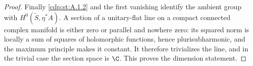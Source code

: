 \begin{proof}
Finally \ref{cdp:st:A.1.2} and the first vanishing identify the ambient group with $H^0(\widetilde S,\eta^*A)$. A section of a unitary-flat line on a compact connected complex manifold is either zero or parallel and nowhere zero: its squared norm is locally a sum of squares of holomorphic functions, hence plurisubharmonic, and the maximum principle makes it constant. It therefore trivializes the line, and in the trivial case the section space is $\C$. This proves the dimension statement.
\end{proof}


